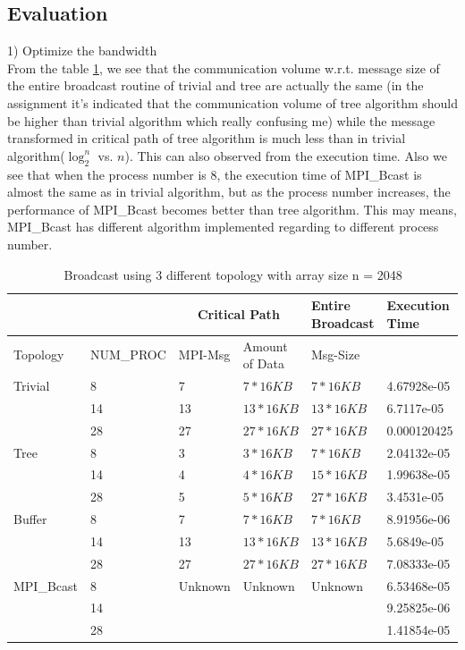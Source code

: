 \documentclass[article]{scrartcl}
\begin{document}
\subsection{Evaluation}
1) Optimize the bandwidth\\
From the table \ref{tab::broadcast}, we see that the communication volume w.r.t. message size of the entire broadcast routine 
of trivial and tree are actually the same (in the assignment it's indicated that the communication volume of tree algorithm should be higher than trivial algorithm which really confusing me) 
while the message transformed in critical path of tree algorithm is much less than in trivial algorithm($ \log_2^n$ vs. $n$).
This can also observed from the execution time. Also we see that when the process number is 8, the execution time of MPI\_Bcast is almost the same as 
in trivial algorithm, but as the process number increases, the performance of MPI\_Bcast becomes better than tree algorithm.
This may means, MPI\_Bcast has different algorithm implemented regarding to different process number.
\begin{table}[h!]
  \centering
\begin{tabular}{ |p{2cm}|p{2cm}|p{2cm}|p{3cm}|p{3cm}|p{3cm}|  }
  \hline
   & & \multicolumn{2}{|c|}{Critical Path}& Entire Broadcast &Execution Time \\
  \hline
  Topology & NUM\_PROC & MPI-Msg & Amount of Data & Msg-Size& \\
  \hline
  Trivial & 8 & 7 & $7*16KB$ & $7*16KB$ & 4.67928e-05 \\
    & 14 &13 & $13*16KB$ & $13*16KB$ &  6.7117e-05\\
   & 28 & 27 & $27*16KB$ & $27*16KB$ &  0.000120425\\
   \hline
   Tree & 8 & 3 & $3*16KB$ & $7*16KB$ & 2.04132e-05 \\
   & 14 &4 & $4*16KB$ & $15*16KB$ &  1.99638e-05\\
  & 28 & 5 & $5*16KB$ & $27*16KB$ &  3.4531e-05\\
  \hline
  Buffer & 8 & 7 & $7*16KB$ & $7*16KB$ & 8.91956e-06 \\
  & 14 &13 & $13*16KB$ & $13*16KB$ &  5.6849e-05\\
 & 28 & 27 & $27*16KB$ & $27*16KB$ &  7.08333e-05\\
  \hline
  MPI\_Bcast & 8 & Unknown & Unknown & Unknown & 6.53468e-05 \\
  & 14 & &  &  &  9.25825e-06\\
 & 28 & &  &  &  1.41854e-05\\
  \hline
  \end{tabular}
  \caption{Broadcast using 3 different topology with array size n = 2048}
  \label{tab::broadcast}
\end{table}
\end{document}
